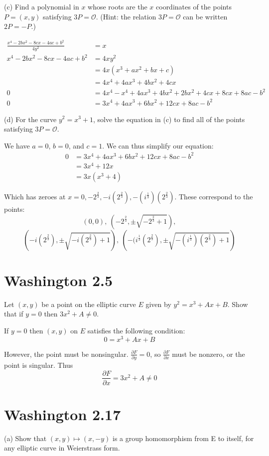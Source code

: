 \documentclass{article}
\begin{document}
(c) Find a polynomial in $x$ whose roots are the $x$ coordinates of the points $P=(x,y)$ satisfying $3P=\mathcal{O}$. (Hint: the relation $3P = \mathcal{O}$ can be written $2P = -P$.)

\begin{align*}
\frac{x^4 - 2bx^2 - 8cx - 4ac + b^2}{4y^2} &= x \\
x^4 - 2bx^2 - 8cx - 4ac + b^2 &= 4xy^2 \\
&= 4x(x^3 + ax^2 + bx + c) \\
&= 4x^4 + 4ax^3 + 4bx^2 + 4cx \\
0 &= 4x^4 - x^4 + 4ax^3 + 4bx^2 + 2bx^2 + 4cx + 8cx + 8ac - b^2 \\
0 &= 3x^4 + 4ax^3 + 6bx^2 + 12cx + 8ac - b^2
\end{align*}

(d) For the curve $y^2 = x^3 + 1$, solve the equation in (c) to find all of the points satisfying $3P = \mathcal{O}$.

We have $a = 0$, $b = 0$, and $c = 1$. We can thus simplify our equation:
\begin{align*}
0 &= 3x^4 + 4ax^3 + 6bx^2 + 12cx + 8ac - b^2 \\
&= 3x^4 + 12x \\
&= 3x(x^3 + 4)
\end{align*}

Which has zeroes at $x = 0,-2^\frac{2}{3},-i(2^\frac{2}{3}),-(i^\frac{1}{3})(2^\frac{2}{3})$. These correspond to the points:
$$(0, 0),~\left(-2^\frac{2}{3}, \pm \sqrt{-2^\frac{2}{3} + 1}\right),$$
$$\left(-i(2^\frac{2}{3}), \pm \sqrt{-i(2^\frac{2}{3}) + 1}\right),~\left(-(i^\frac{1}{3}(2^\frac{2}{3}), \pm \sqrt{-(i^\frac{1}{3})(2^\frac{2}{3}) + 1}\right)$$

\section{Washington 2.5}
Let $(x,y)$ be a point on the elliptic curve $E$ given by $y^2 = x^3 + Ax + B$. Show that if $y = 0$ then $3x^2 + A \neq 0$. 

If $y = 0$ then $(x,y)$ on $E$ satisfies the following condition:
$$0 = x^3 + Ax + B$$

However, the point must be nonsingular. $\frac{\partial F}{\partial y} = 0$, so $\frac{\partial F}{\partial x}$ must be nonzero, or the point is singular. Thus
$$\frac{\partial F}{\partial x} = 3x^2 + A \neq 0$$

\section{Washington 2.17}
(a) Show that $(x,y) \mapsto (x,−y)$ is a group homomorphism from E to itself, for any elliptic curve in Weierstrass form.
\end{document}
